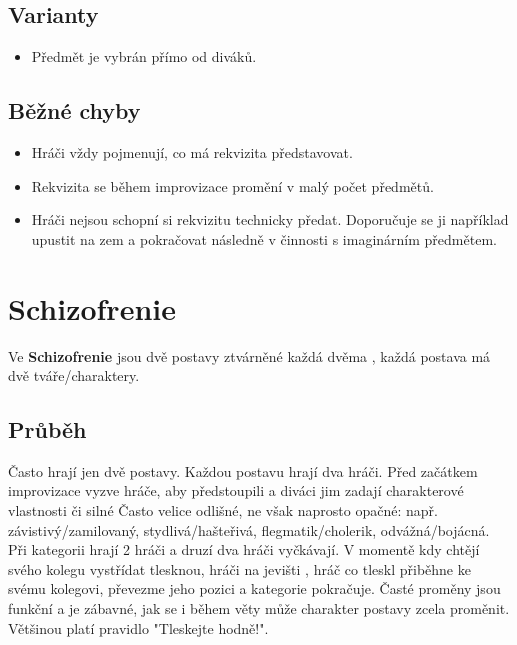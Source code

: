 \documentclass[main.tex]{subfiles}
\begin{document}
\subsection{ Varianty } \begin{itemize}
\item Předmět je vybrán přímo od diváků.
\end{itemize}
 
\subsection{ Běžné chyby } \begin{itemize}
\item Hráči vždy pojmenují, co má rekvizita představovat.
\item Rekvizita se během improvizace promění v malý počet předmětů.
\item Hráči nejsou schopní si rekvizitu technicky předat. Doporučuje se ji například upustit na zem a pokračovat následně v činnosti s imaginárním předmětem.
\end{itemize}
 
 
 
 
\needspace{5cm} \section{Schizofrenie} \label{schizofrenie}  
 
Ve \textbf{Schizofrenie} jsou dvě postavy ztvárněné každá dvěma , každá postava má dvě tváře/charaktery. 
 
\subsection{ Průběh } Často hrají jen dvě postavy. Každou postavu hrají dva hráči. Před začátkem improvizace vyzve  hráče, aby předstoupili a diváci jim zadají charakterové vlastnosti či silné  Často velice odlišné, ne však naprosto opačné: např. závistivý/zamilovaný, stydlivá/hašteřivá, flegmatik/cholerik, odvážná/bojácná. 
Při kategorii hrají 2 hráči a druzí dva hráči vyčkávají. V momentě kdy chtějí svého kolegu vystřídat tlesknou, hráči na jevišti , hráč co tleskl přiběhne ke svému kolegovi, převezme jeho pozici a kategorie pokračuje. Časté proměny jsou funkční a je zábavné, jak se i během věty může charakter postavy zcela proměnit. Většinou platí pravidlo "Tleskejte hodně!". 
 
\end{document}
